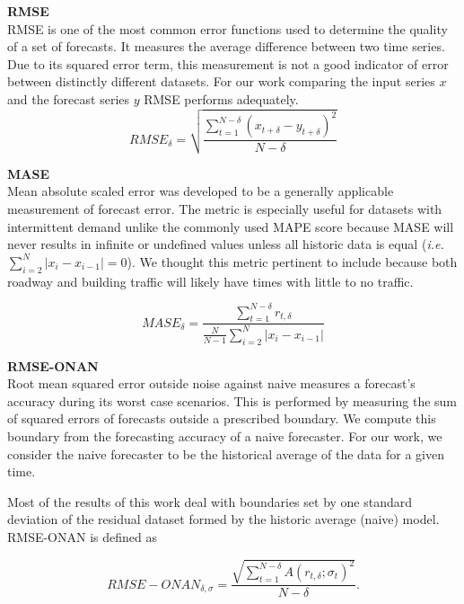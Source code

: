 \bigskip
\noindent \textbf{RMSE} \\
RMSE is one of the most common error functions used to determine the quality of a set of forecasts.  It measures the average difference between two time series.  Due to its squared error term, this measurement is not a good indicator of error between distinctly different datasets.  For our work comparing the input series $x$ and the forecast series $y$ RMSE performs adequately.
\begin{equation}
RMSE_{\delta} = \sqrt{\frac{\sum_{t = 1}^{N - \delta}{(x_{t + \delta} - y_{t + \delta})^{2}}}{N - \delta}}
\end{equation}

\bigskip
\noindent \textbf{MASE} \\
Mean absolute scaled error was developed to be a generally applicable measurement of forecast error.  The metric is especially useful for datasets with intermittent demand unlike the commonly used MAPE score because MASE will never results in infinite or undefined values unless all historic data is equal (\textit{i.e.\ }$\sum_{i = 2}^{N}|x_{i} - x_{i - 1}| = 0$)\cite{Hyndman2008}.  We thought this metric pertinent to include because both roadway and building traffic will likely have times with little to no traffic.  

\begin{equation}
MASE_{\delta} = \frac{\sum_{t = 1}^{N - \delta}{r_{t, \delta}}}{\frac{N}{N - 1}\sum_{i = 2}^{N}|x_{i} - x_{i - 1}|}
\end{equation}

\bigskip
\noindent \textbf{RMSE-ONAN} \\
Root mean squared error outside noise against naive measures a forecast's accuracy during its worst case scenarios.  This is performed by measuring the sum of squared errors of forecasts outside a prescribed boundary.  We compute this boundary from the forecasting accuracy of a naive forecaster.  For our work, we consider the naive forecaster to be the historical average of the data for a given time.  

Most of the results of this work deal with boundaries set by one standard deviation of the residual dataset formed by the historic average (naive) model.  RMSE-ONAN is defined as


\begin{equation}
RMSE-ONAN_{\delta, \sigma} = \frac{\sqrt{\sum_{t = 1}^{N - \delta}{A(r_{t, \delta}; \sigma_{t})^{2}}}} {N - \delta}.
\end{equation}

